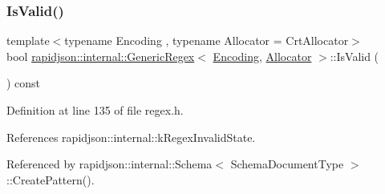 \subsubsection{\texorpdfstring{IsValid()}{IsValid()}}
{\footnotesize\ttfamily template$<$typename Encoding , typename Allocator  = Crt\+Allocator$>$ \\
bool \mbox{\hyperlink{classrapidjson_1_1internal_1_1_generic_regex}{rapidjson\+::internal\+::\+Generic\+Regex}}$<$ \mbox{\hyperlink{classrapidjson_1_1_encoding}{Encoding}}, \mbox{\hyperlink{classrapidjson_1_1_allocator}{Allocator}} $>$\+::Is\+Valid (\begin{DoxyParamCaption}{ }\end{DoxyParamCaption}) const}



Definition at line 135 of file regex.\+h.


\begin{DoxyCode}{0}

\end{DoxyCode}


References rapidjson\+::internal\+::k\+Regex\+Invalid\+State.



Referenced by rapidjson\+::internal\+::\+Schema$<$ Schema\+Document\+Type $>$\+::\+Create\+Pattern().

\mbox{\label{classrapidjson_1_1internal_1_1_generic_regex_a03202b58856e5d43fbb6e8e7546a0bd6}} 
